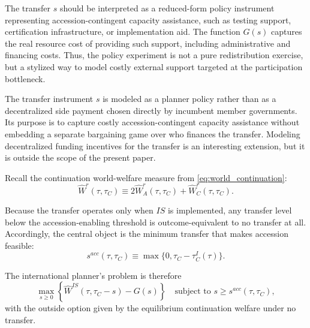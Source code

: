 The transfer $s$ should be interpreted as a reduced-form policy instrument
representing accession-contingent capacity assistance, such as testing support,
certification infrastructure, or implementation aid. The function $G(s)$
captures the real resource cost of providing such support, including
administrative and financing costs. Thus, the policy experiment is not a pure
redistribution exercise, but a stylized way to model costly external support
targeted at the participation bottleneck.

The transfer instrument $s$ is modeled as a planner policy rather than as a
decentralized side payment chosen directly by incumbent member governments. Its
purpose is to capture costly accession-contingent capacity assistance without
embedding a separate bargaining game over who finances the transfer. Modeling
decentralized funding incentives for the transfer is an interesting extension,
but it is outside the scope of the present paper.

Recall the continuation world-welfare measure from
\eqref{eq:world_continuation}:
\[
\widehat W^r(\tau,\tau_C)\equiv 2\widehat W_A^r(\tau,\tau_C)+\widehat W_C^r(\tau,\tau_C).
\]

Because the transfer operates only when $IS$ is implemented, any transfer
level below the accession-enabling threshold is outcome-equivalent to no
transfer at all. Accordingly, the central object is the minimum transfer that
makes accession feasible:
\begin{equation}
s^{acc}(\tau,\tau_C)
\equiv
\max\{0,\tau_C-\tau_C^I(\tau)\}.
\label{eq:sacc}
\end{equation}

The international planner's problem is therefore
\begin{equation}
\max_{s\ge 0}
\left\{
\widehat W^{IS}(\tau,\tau_C-s)-G(s)
\right\}
\quad
\text{subject to }
s\ge s^{acc}(\tau,\tau_C),
\label{eq:planner_transfer}
\end{equation}
with the outside option given by the equilibrium continuation welfare under no
transfer.

